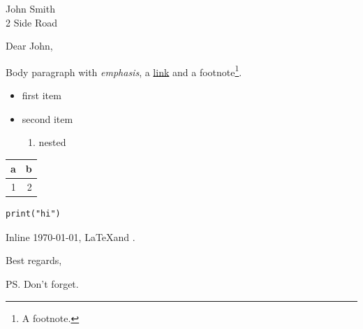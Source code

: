 \documentclass[11pt]{scrlttr2}
\date{2026-09-28}
\begin{document}

\begin{letter}{%
John Smith\\
2 Side Road}

\opening{Dear John,}

Body paragraph with \emph{emphasis}, a \href{https://orgmode.org}{link} and a
footnote\footnote{A footnote.}.

\begin{itemize}
\item first item
\item second item
\begin{enumerate}
\item nested
\end{enumerate}
\end{itemize}

\begin{center}
\begin{tabular}{rr}
a & b\\
\hline
1 & 2\\
\end{tabular}
\end{center}

\begin{verbatim}
print("hi")
\end{verbatim}

\vspace{1cm}
\bigskip
\medskip
Inline \today, \LaTeX and .

\smallskip
\closing{Best regards,}

\ps{Don't forget.}



\end{letter}
\vfill
\end{document}

